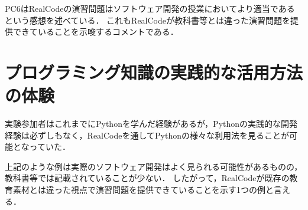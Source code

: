 PC6はRealCodeの演習問題はソフトウェア開発の授業においてより適当であるという感想を述べている．
これもRealCodeが教科書等とは違った演習問題を提供できていることを示唆するコメントである．



\section{プログラミング知識の実践的な活用方法の体験}

実験参加者はこれまでにPythonを学んだ経験があるが，Pythonの実践的な開発経験は必ずしもなく，RealCodeを通してPythonの様々な利用法を見ることが可能となっていた．




上記のような例は実際のソフトウェア開発はよく見られる可能性があるものの，教科書等では記載されていることが少ない．
したがって，RealCodeが既存の教育素材とは違った視点で演習問題を提供できていることを示す1つの例と言える．

